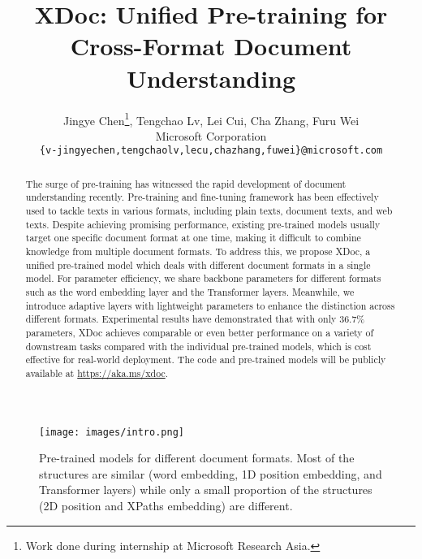\documentclass[11pt]{article}
\title{XDoc: Unified Pre-training for Cross-Format Document Understanding}
\author{Jingye Chen\thanks{Work done during internship at Microsoft Research Asia.}, Tengchao Lv, Lei Cui, Cha Zhang, Furu Wei\\ 
Microsoft Corporation\\
\texttt{\{v-jingyechen,tengchaolv,lecu,chazhang,fuwei\}@microsoft.com}
}
\begin{document}
\maketitle
\begin{abstract}
The surge of pre-training has witnessed the rapid development of document understanding recently. Pre-training and fine-tuning framework has been effectively used to tackle texts in various formats, including plain texts, document texts, and web texts. Despite achieving promising performance, existing pre-trained models usually target one specific document format at one time, making it difficult to combine knowledge from multiple document formats. To address this, we propose XDoc, a unified pre-trained model which deals with different document formats in a single model. For parameter efficiency, we share backbone parameters for different formats such as the word embedding layer and the Transformer layers. Meanwhile, we introduce adaptive layers with lightweight parameters to enhance the distinction across different formats. Experimental results have demonstrated that with only 36.7\% parameters, XDoc achieves comparable or even better performance on a variety of downstream tasks compared with the individual pre-trained models, which is cost effective for real-world deployment. The code and pre-trained models will be publicly available at \url{https://aka.ms/xdoc}.
\end{abstract}

\begin{figure}[t]
    \centering
    \texttt{[image: images/intro.png]}
    \caption{Pre-trained models for different document formats. Most of the structures are similar (word embedding, 1D position embedding, and Transformer layers) while only a small proportion of the structures (2D position and XPaths embedding) are different.}
    \label{fig:intro}
\end{figure}
\end{document}
